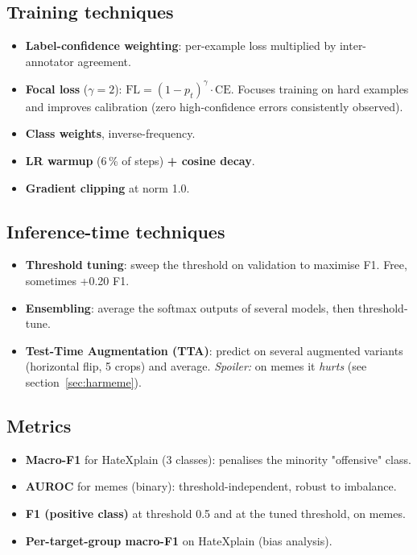 \documentclass[11pt,a4paper]{article}
\begin{document}
\subsection{Training techniques}

\begin{itemize}[leftmargin=*]
    \item \textbf{Label-confidence weighting}: per-example loss multiplied by
    inter-annotator agreement.
    \item \textbf{Focal loss} ($\gamma=2$): $\mathrm{FL} = (1-p_t)^\gamma \cdot
    \mathrm{CE}$. Focuses training on hard examples and improves calibration (zero
    high-confidence errors consistently observed).
    \item \textbf{Class weights}, inverse-frequency.
    \item \textbf{LR warmup} (6\,\% of steps) \textbf{+ cosine decay}.
    \item \textbf{Gradient clipping} at norm 1.0.
\end{itemize}

\subsection{Inference-time techniques}

\begin{itemize}[leftmargin=*]
    \item \textbf{Threshold tuning}: sweep the threshold on validation to maximise
    F1. Free, sometimes +0.20 F1.
    \item \textbf{Ensembling}: average the softmax outputs of several models, then
    threshold-tune.
    \item \textbf{Test-Time Augmentation (TTA)}: predict on several augmented
    variants (horizontal flip, 5 crops) and average. \emph{Spoiler:} on memes it
    \emph{hurts} (see section~\ref{sec:harmeme}).
\end{itemize}

\subsection{Metrics}

\begin{itemize}[leftmargin=*]
    \item \textbf{Macro-F1} for HateXplain (3 classes): penalises the minority
    "offensive" class.
    \item \textbf{AUROC} for memes (binary): threshold-independent, robust to
    imbalance.
    \item \textbf{F1 (positive class)} at threshold 0.5 and at the tuned threshold,
    on memes.
    \item \textbf{Per-target-group macro-F1} on HateXplain (bias analysis).
\end{itemize}
\end{document}
